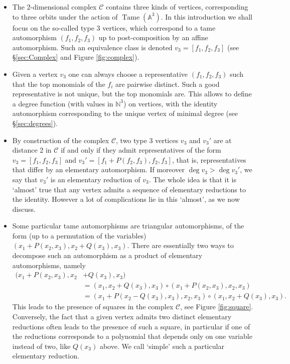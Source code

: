 \documentclass[reqno,oneside,11pt]{amsart}
\theoremstyle{plain}
\theoremstyle{definition}
\newcommand{\N}{\mathbb{N}}
\newcommand{\A}{{\mathbb{A}}}
\DeclareMathOperator{\Tame}{Tame}
\newcommand{\Comp}{\mathcal{C}}
\newcommand{\TA}{\Tame(\A^3)}
\begin{document}
\begin{itemize}[wide]
\item The 2-dimensional complex $\Comp$ contains three kinds of vertices, corresponding to three orbits under the action of $\TA$.
In this introduction we shall focus on the so-called type 3 vertices, which correspond to a tame automorphism 
$(f_1,f_2,f_3)$ up to post-composition by an affine automorphism.
Such an equivalence class is denoted $v_3 = [f_1, f_2, f_3]$ (see \S\ref{sec:Complex} and Figure \ref{fig:complex}).

\item Given a vertex $v_3$ one can always choose a representative $(f_1,f_2,f_3)$ such that the top monomials of the $f_i$ are pairwise distinct. Such a good representative is not unique, but the top monomials are. This allows to define a degree function (with values in $\N^3$) on vertices, with the identity automorphism corresponding to the unique vertex of minimal degree (see \S\ref{sec:degrees}). 

\item By construction of the complex $\Comp$, two type 3 vertices $v_3$ and $v_3'$ are at distance 2 in $\Comp$ if and only if they admit representatives of the form $v_3 = [f_1, f_2, f_3]$ and $v_3' = [f_1 + P(f_2, f_3), f_2, f_3]$, that is, representatives that differ by an elementary automorphism.
If moreover $\deg v_3 > \deg v_3'$, we say that $v_3'$ is an elementary reduction of $v_3$.
The whole idea is that it is `almost' true that any vertex admits a sequence of elementary reductions to the identity. However a lot of complications lie in this `almost', as we now discuss.

\item Some particular tame automorphisms are triangular automorphisms, of the form (up to a permutation of the variables) $(x_1 + P(x_2, x_3), x_2 + Q(x_3), x_3)$. There are essentially two ways to decompose such an automorphism as a product of elementary automorphisms, namely
\begin{align*}
(x_1 + P(x_2, x_3), x_2 &+ Q(x_3), x_3) \\
&= (x_1, x_2 + Q(x_3), x_3 ) \circ (x_1 + P(x_2, x_3), x_2, x_3)\\
&= (x_1 + P(x_2-Q(x_3), x_3), x_2, x_3) \circ (x_1, x_2 + Q(x_3), x_3).
\end{align*}
This leads to the presence of squares in the complex $\Comp$, see Figure \ref{fig:square}.
Conversely, the fact that a given vertex admits two distinct elementary
reductions often leads to the presence of such a square, in particular if one of
the reductions corresponds to a polynomial that depends only on one variable
instead of two, like $Q(x_3)$ above. We call `simple' such a particular
elementary reduction.


\end{itemize}
\end{document}
